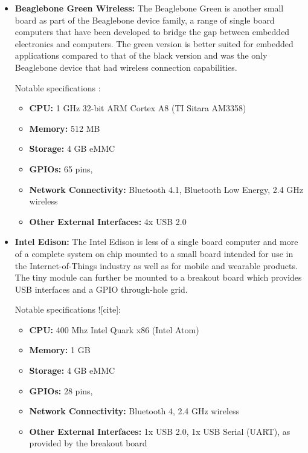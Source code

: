 \begin{itemize}
        \item \textbf{Beaglebone Green Wireless:}
          The Beaglebone Green is another small board as part of the Beaglebone device family, a range of single board computers that have been developed to bridge the gap between embedded electronics and computers. The green version is better suited for embedded applications compared to that of the black version and was the only Beaglebone device that had wireless connection capabilities.
          
          Notable specifications \cite{mouserbeaglebone_2016}:
          \begin{itemize}
            \item \textbf{CPU:} 1 GHz 32-bit ARM Cortex A8 (TI Sitara AM3358)
            \item \textbf{Memory:} 512 MB
            \item \textbf{Storage:} 4 GB eMMC
            \item \textbf{GPIOs:} 65 pins, 
            \item \textbf{Network Connectivity:} Bluetooth 4.1, Bluetooth Low Energy, 2.4 GHz wireless
            \item \textbf{Other External Interfaces:} 4x USB 2.0
          \end{itemize}
          
        \item \textbf{Intel Edison:}
          The Intel Edison is less of a single board computer and more of a complete system on chip mounted to a small board intended for use in the Internet-of-Things industry as well as for mobile and wearable products. The tiny module can further be mounted to a breakout board which provides USB interfaces and a GPIO through-hole grid.

          Notable specifications ![cite]:
          \begin{itemize}
            \item \textbf{CPU:} 400 Mhz Intel Quark x86 (Intel Atom)
            \item \textbf{Memory:} 1 GB
            \item \textbf{Storage:} 4 GB eMMC
            \item \textbf{GPIOs:} 28 pins, 
            \item \textbf{Network Connectivity:} Bluetooth 4, 2.4 GHz wireless
            \item \textbf{Other External Interfaces:} 1x USB 2.0, 1x USB Serial (UART), as provided by the breakout board
          \end{itemize}
 

\end{itemize}
